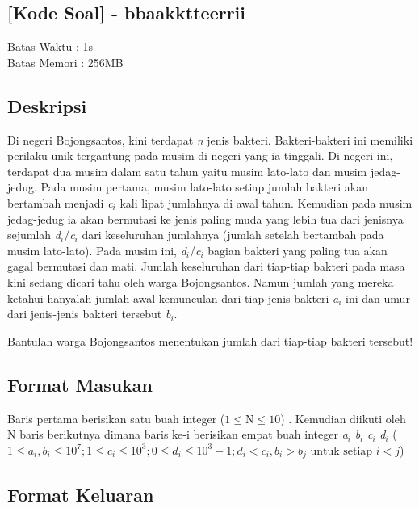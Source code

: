 \documentclass{article}
\begin{document}
\begin{center}
    \section*{[Kode Soal] - bbaakktteerrii} %
    Batas Waktu : 1s \\  %
    Batas Memori :  256MB \\ %
\end{center}

\subsection*{Deskripsi}

Di negeri Bojongsantos, kini terdapat \textit{n} jenis bakteri. Bakteri-bakteri ini memiliki perilaku unik tergantung pada musim di negeri yang ia tinggali. Di negeri ini, terdapat dua musim dalam satu tahun yaitu musim lato-lato dan musim jedag-jedug. Pada musim pertama, musim lato-lato setiap jumlah bakteri akan bertambah menjadi \textit{c}$_{i}$ kali lipat jumlahnya di awal tahun. Kemudian pada musim jedag-jedug ia akan bermutasi ke jenis paling muda yang lebih tua dari jenisnya sejumlah \textit{d}$_{i}$/\textit{c}$_{i}$ dari keseluruhan jumlahnya (jumlah setelah bertambah pada musim lato-lato). Pada musim ini, \textit{d}$_{i}$/\textit{c}$_{i}$ bagian bakteri yang paling tua akan gagal bermutasi dan mati. Jumlah keseluruhan dari tiap-tiap bakteri pada masa kini sedang dicari tahu oleh warga Bojongsantos. Namun jumlah yang mereka ketahui hanyalah jumlah awal kemunculan dari tiap jenis bakteri \textit{a}$_{i}$ ini dan umur dari jenis-jenis bakteri tersebut \textit{b}$_{i}$.

Bantulah warga Bojongsantos menentukan jumlah dari tiap-tiap bakteri tersebut!

\subsection*{Format Masukan}
Baris pertama berisikan satu buah integer ($ 1 \leq \text{N} \leq 10 $)
. Kemudian diikuti oleh N baris berikutnya dimana baris ke-i berisikan empat buah integer \textit{a}$_{i}$ \textit{b}$_{i}$ \textit{c}$_{i}$ \textit{d}$_{i}$ ($ 1 \leq a_{i},b_{i} \leq 10^{7}; 1 \leq c_{i} \leq 10^{3}; 0 \leq d_{i} \leq 10^{3}-1; d_{i} < c_{i}, b_{i} > b_{j} \text{ untuk setiap } i < j $)

\subsection*{Format Keluaran}
\end{document}
